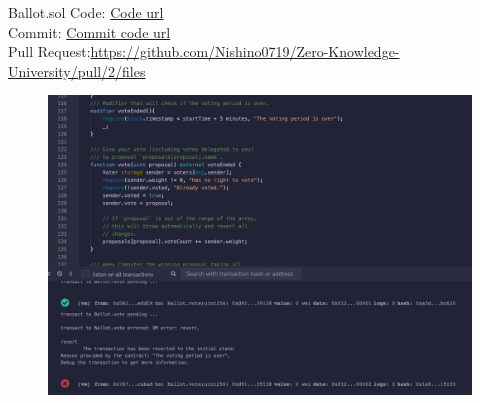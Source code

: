 \documentclass[a4paper,10pt]{jsarticle}
\begin{document}
\begin{enumerate}
    Ballot.sol
    \newline
    Code: \href{https://github.com/Nishino0719/Zero-Knowledge-University/blob/main/BackgroundAssignment/B/Ballot.sol}{Code url}\mbox{}\\
    Commit: \href{https://github.com/Nishino0719/Zero-Knowledge-University/pull/2/commits/33740f496a53ee4d4b72f3ebaa7f93af42f2d31e}{Commit code url}\mbox{}\\
    Pull Request:\href{https://github.com/Nishino0719/Zero-Knowledge-University/pull/2/files}{https://github.com/Nishino0719/Zero-Knowledge-University/pull/2/files}
    \begin{figure}[h]
        \includegraphics[width=\linewidth]{Ballot.png}
    \end{figure}
    
  \end{enumerate}
\end{document}
